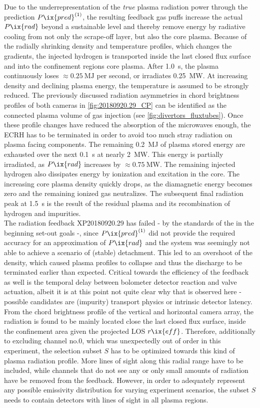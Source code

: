             Due to the underrepresentation of the \textit{true} plasma radiation power through the prediction $P\ix{pred}^{\left(1\right)}$, the resulting feedback gas puffs increase the actual $P\ix{rad}$ beyond a sustainable level and thereby remove energy by radiative cooling from not only the scrape-off layer, but also the core plasma. Because of the radially shrinking density and temperature profiles, which changes the gradients, the injected hydrogen is transported inside the last closed flux surface and into the confinement regions core plasma. After \SI{1.0}{\second}, the plasma continuously loses $\approx\SI{0.25}{\mega\joule}$ per second, or irradiates \SI{0.25}{\mega\watt}. At increasing density and declining plasma energy, the temperature is assumed to be strongly reduced. The previously discussed radiation asymmetries in chord brightness profiles of both cameras in \cref{fig:20180920.29_CP} can be identified as the connected plasma volume of gas injection (see \cref{fig:divertors_fluxtubes}). Once these profile changes have reduced the absorption of the microwaves enough, the ECRH has to be terminated in order to avoid too much stray radiation on plasma facing components. The remaining \SI{0.2}{\mega\joule} of plasma stored energy are exhausted over the next \SI{0.1}{\second} at nearly \SI{2}{\mega\watt}. This energy is partially irradiated, as $P\ix{rad}$ increases by $\approx\SI{0.75}{\mega\watt}$. The remaining injected hydrogen also dissipates energy by ionization and excitation in the core. The increasing core plasma density quickly drops, as the diamagnetic energy becomes zero and the remaining ionized gas neutralizes. The subsequent final radiation peak at \SI{1.5}{\second} is the result of the residual plasma and its recombination of hydrogen and impurities.\\%
            The radiation feedback XP20180920.29 has failed - by the standards of the in the beginning set-out goals -, since $P\ix{pred}^{\left(1\right)}$ did not provide the required accuracy for an approximation of $P\ix{rad}$ and the system was seemingly not able to achieve a scenario of (stable) detachment. This led to an overshoot of the  density, which caused plasma profiles to collapse and thus the discharge to be terminated earlier than expected. Critical towards the efficiency of the feedback as well is the temporal delay between bolometer detector reaction and valve actuation, albeit it is at this point not quite clear why that is observed here - possible candidates are (impurity) transport physics or intrinsic detector latency. From the chord brightness profile of the vertical and horizontal camera array, the radiation is found to be mainly located close the last closed flux surface, inside the confinement area given the projected LOS $r\ix{eff}$. Therefore, additionally to excluding channel no.0, which was unexpectedly out of order in this experiment, the selection subset $S$ has to be optimized towards this kind of plasma radiation profile. More lines of sight along this radial range have to be included, while channels that do not see any or only small amounts of radiation have be removed from the feedback. However, in order to adequately represent any possible emissivity distribution for varying experiment scenarios, the subset $S$ needs to contain detectors with lines of sight in all plasma regions.%
%
